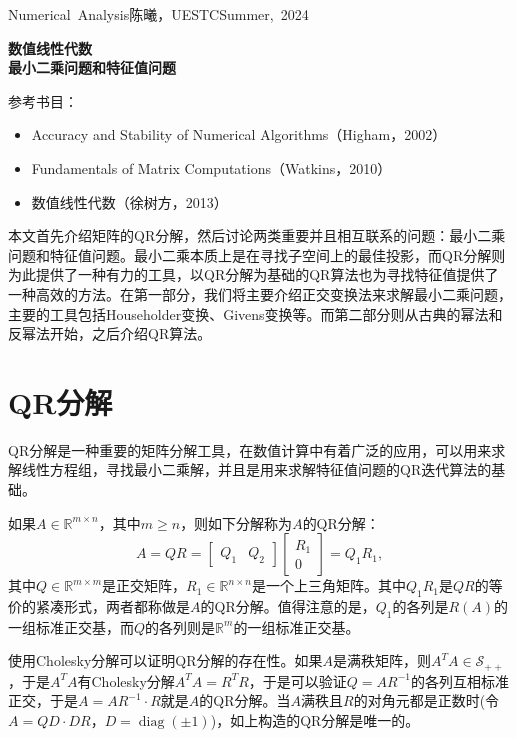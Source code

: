 \documentclass[a4paper,10pt]{ctexart}
\begin{document}
\hfill\vbox{\hbox{Numerical Analysis}\hbox{陈曦，UESTC}\hbox{Summer, 2024}}

\begin{center}\Large
    \textbf{数值线性代数}\\{\normalsize\bf {最小二乘问题和特征值问题}}
\end{center}
\vskip 30pt
\small {参考书目：
\begin{itemize}
    \item Accuracy and Stability of Numerical Algorithms（Higham，2002）
    \item Fundamentals of Matrix Computations（Watkins，2010）
    \item 数值线性代数（徐树方，2013）
\end{itemize}}

本文首先介绍矩阵的QR分解，然后讨论两类重要并且相互联系的问题：最小二乘问题和特征值问题。最小二乘本质上是在寻找子空间上的最佳投影，而QR分解则为此提供了一种有力的工具，以QR分解为基础的QR算法也为寻找特征值提供了一种高效的方法。在第一部分，我们将主要介绍正交变换法来求解最小二乘问题，主要的工具包括Householder变换、Givens变换等。而第二部分则从古典的幂法和反幂法开始，之后介绍QR算法。

\section{QR分解}
QR分解是一种重要的矩阵分解工具，在数值计算中有着广泛的应用，可以用来求解线性方程组，寻找最小二乘解，并且是用来求解特征值问题的QR迭代算法的基础。

如果$ A\in \mathbb{R}^{m\times n} $，其中$ m\geqslant n $，则如下分解称为$ A $的QR分解：
\begin{equation}
    A = QR = 
    \begin{bmatrix}
        Q_1 & Q_2
    \end{bmatrix}
    \begin{bmatrix}
        R_1\\
        0
    \end{bmatrix} = Q_1 R_1,
\end{equation}
其中$ Q\in \mathbb{R}^{m\times m} $是正交矩阵，$ R_1\in \mathbb{R}^{n\times n} $是一个上三角矩阵。其中$ Q_1R_1 $是$ QR $的等价的紧凑形式，两者都称做是$ A $的QR分解。值得注意的是，$ Q_1 $的各列是$ R(A) $的一组标准正交基，而$ Q $的各列则是$ \mathbb{R}^m $的一组标准正交基。

使用Cholesky分解可以证明QR分解的存在性。如果$ A $是满秩矩阵，则$ A^TA\in \mathcal{S}_{++} $，于是$ A^TA $有Cholesky分解$ A^TA = R^T R$，于是可以验证$ Q = AR^{-1} $的各列互相标准正交，于是$ A = AR^{-1}\cdot R $就是$ A $的QR分解。当$ A $满秩且$ R $的对角元都是正数时(令$ A = QD\cdot DR $，$ D = \operatorname{diag}(\pm 1) $)，如上构造的QR分解是唯一的。
\end{document}

